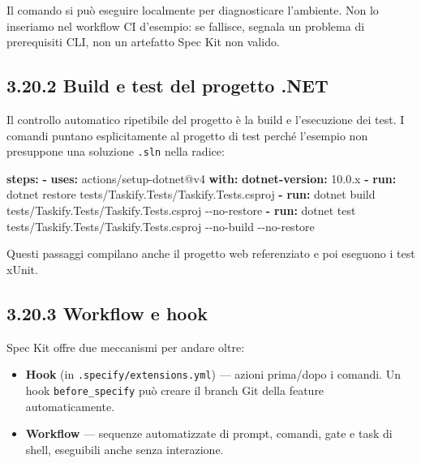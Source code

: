 \documentclass[
  italian,
  10pt,
]{book}
\newenvironment{Shaded}{\begin{snugshade}}{\end{snugshade}}
\newcommand{\AttributeTok}[1]{\textcolor[rgb]{0.13,0.29,0.53}{#1}}
\newcommand{\FunctionTok}[1]{\textcolor[rgb]{0.13,0.29,0.53}{\textbf{#1}}}
\newcommand{\KeywordTok}[1]{\textcolor[rgb]{0.13,0.29,0.53}{\textbf{#1}}}
\newcommand{\StringTok}[1]{\textcolor[rgb]{0.31,0.60,0.02}{#1}}
\providecommand{\tightlist}{%
  \setlength{\itemsep}{0pt}\setlength{\parskip}{0pt}}
\begin{document}
Il comando si può eseguire localmente per diagnosticare l'ambiente. Non
lo inseriamo nel workflow CI d'esempio: se fallisce, segnala un problema
di prerequisiti CLI, non un artefatto Spec Kit non valido.

\subsection{3.20.2 Build e test del progetto
.NET}\label{build-e-test-del-progetto-.net}

Il controllo automatico ripetibile del progetto è la build e
l'esecuzione dei test. I comandi puntano esplicitamente al progetto di
test perché l'esempio non presuppone una soluzione \texttt{.sln} nella
radice:

\begin{Shaded}
\begin{Highlighting}[]
\FunctionTok{steps}\KeywordTok{:}
\AttributeTok{  }\KeywordTok{{-} }\FunctionTok{uses}\KeywordTok{:}\AttributeTok{ actions/setup{-}dotnet@v4}
\AttributeTok{    }\FunctionTok{with}\KeywordTok{:}
\AttributeTok{      }\FunctionTok{dotnet{-}version}\KeywordTok{:}\AttributeTok{ }\StringTok{\textquotesingle{}10.0.x\textquotesingle{}}
\AttributeTok{  }\KeywordTok{{-} }\FunctionTok{run}\KeywordTok{:}\AttributeTok{ dotnet restore tests/Taskify.Tests/Taskify.Tests.csproj}
\AttributeTok{  }\KeywordTok{{-} }\FunctionTok{run}\KeywordTok{:}\AttributeTok{ dotnet build tests/Taskify.Tests/Taskify.Tests.csproj {-}{-}no{-}restore}
\AttributeTok{  }\KeywordTok{{-} }\FunctionTok{run}\KeywordTok{:}\AttributeTok{ dotnet test tests/Taskify.Tests/Taskify.Tests.csproj {-}{-}no{-}build {-}{-}no{-}restore}
\end{Highlighting}
\end{Shaded}

Questi passaggi compilano anche il progetto web referenziato e poi
eseguono i test xUnit.

\subsection{3.20.3 Workflow e hook}\label{workflow-e-hook}

Spec Kit offre due meccanismi per andare oltre:

\begin{itemize}
\tightlist
\item
  \textbf{Hook} (in \texttt{.specify/extensions.yml}) --- azioni
  prima/dopo i comandi. Un hook \texttt{before\_specify} può creare il
  branch Git della feature automaticamente.
\item
  \textbf{Workflow} --- sequenze automatizzate di prompt, comandi, gate
  e task di shell, eseguibili anche senza interazione.
\end{itemize}
\end{document}
